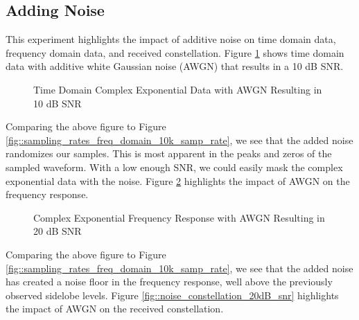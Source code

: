 \documentclass{article}
\begin{document}
\subsection{Adding Noise}

This experiment highlights the impact of additive noise on time domain data, frequency domain data, and received constellation. Figure \ref{fig::noise_time_domain_10dB_snr} shows time domain data with additive white Gaussian noise (AWGN) that results in a 10 dB SNR.

\begin{figure}[H]
	\centerline{}
	\caption{Time Domain Complex Exponential Data with AWGN Resulting in 10 dB SNR}
	\label{fig::noise_time_domain_10dB_snr}
\end{figure}

Comparing the above figure to Figure \ref{fig::sampling_rates_freq_domain_10k_samp_rate}, we see that the added noise randomizes our samples. This is most apparent in the peaks and zeros of the sampled waveform. With a low enough SNR, we could easily mask the complex exponential data with the noise. Figure \ref{fig::noise_freq_domain_20dB_snr} highlights the impact of AWGN on the frequency response.

\begin{figure}[H]
	\centerline{}
	\caption{Complex Exponential Frequency Response with AWGN Resulting in 20 dB SNR}
	\label{fig::noise_freq_domain_20dB_snr}
\end{figure}

Comparing the above figure to Figure \ref{fig::sampling_rates_freq_domain_10k_samp_rate}, we see that the added noise has created a noise floor in the frequency response, well above the previously observed sidelobe levels. Figure \ref{fig::noise_constellation_20dB_snr} highlights the impact of AWGN on the received constellation.
\end{document}
